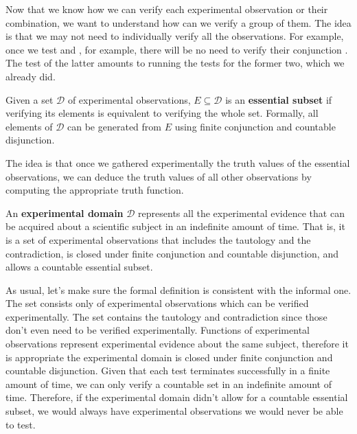 \documentclass[11pt,letterpaper,fleqn]{memoir} %
\begin{document}
Now that we know how we can verify each experimental observation or their combination, we want to understand how can we verify a group of them. The idea is that we may not need to individually verify all the observations. For example, once we test  and , for example, there will be no need to verify their conjunction . The test of the latter amounts to running the tests for the former two, which we already did.

\begin{mathSection}
	\begin{defn}
		Given a set $\mathcal{D}$ of experimental observations, $E \subseteq \mathcal{D}$ is an \textbf{essential subset} if verifying its elements is equivalent to verifying the whole set. Formally, all elements of $\mathcal{D}$ can be generated from $E$ using finite conjunction and countable disjunction.
	\end{defn}
\end{mathSection}

The idea is that once we gathered experimentally the truth values of the essential observations, we can deduce the truth values of all other observations by computing the appropriate truth function.

\begin{mathSection}
\begin{defn}
	An \textbf{experimental domain} $\mathcal{D}$ represents all the experimental evidence that can be acquired about a scientific subject in an indefinite amount of time. That is, it is a set of experimental observations that includes the tautology and the contradiction, is closed under finite conjunction and countable disjunction, and allows a countable essential subset.
\end{defn}
\begin{justification}
	As usual, let's make sure the formal definition is consistent with the informal one. The set consists only of experimental observations which can be verified experimentally. The set contains the tautology and contradiction since those don't even need to be verified experimentally. Functions of experimental observations represent experimental evidence about the same subject, therefore it is appropriate the experimental domain is closed under finite conjunction and countable disjunction. Given that each test terminates successfully in a finite amount of time, we can only verify a countable set in an indefinite amount of time. Therefore, if the experimental domain didn't allow for a countable essential subset, we would always have experimental observations we would never be able to test.
\end{justification}
\end{mathSection}
\end{document}
